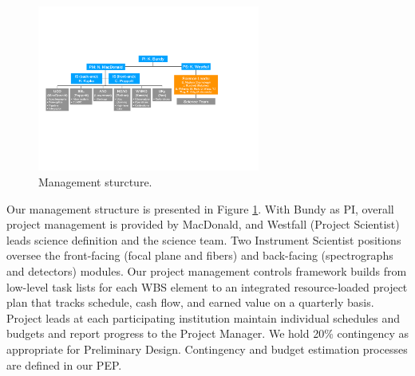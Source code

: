 \documentclass[oneside,11pt]{amsart}
\begin{document}
\begin{figure}\small
\includegraphics[width=0.65\textwidth]{figs/org_chart_v1.pdf}
\caption{Management sturcture.}
\label{fig:org}
\end{figure}

Our management structure is presented in Figure \ref{fig:org}. With
Bundy as PI, overall project management is provided by MacDonald, and
Westfall (Project Scientist) leads science definition and the science
team. Two Instrument Scientist positions oversee the front-facing
(focal plane and fibers) and back-facing (spectrographs and
detectors) modules. Our project management controls framework builds
from low-level task lists for each WBS element to an integrated
resource-loaded project plan that tracks schedule, cash flow, and
earned value on a quarterly basis. Project leads at each
participating institution maintain individual schedules and budgets
and report progress to the Project Manager. We hold 20\% contingency
as appropriate for Preliminary Design. Contingency and budget
estimation processes are defined in our PEP.

\end{document}
